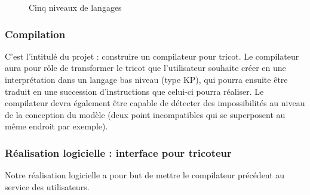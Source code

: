 \documentclass{article}
\begin{document}
    \begin{figure}[!h]
    \centering


    \caption{Cinq niveaux de langages}
    \label{nvx-lg}
    \end{figure}


\subsubsection{Compilation}

C'est l'intitulé du projet : construire un compilateur pour tricot. Le compilateur aura pour rôle de transformer le tricot que
l'utilisateur souhaite créer en une interprétation dans un langage bas niveau (type KP), qui pourra ensuite être traduit en une succession
d'instructions que celui-ci pourra réaliser.
Le compilateur devra également être capable de détecter des impossibilités au niveau de la conception du modèle (deux point incompatibles qui se superposent au même endroit par exemple).


\subsubsection{Réalisation logicielle : interface pour tricoteur}

Notre réalisation logicielle a pour but de mettre le compilateur précédent au service des utilisateurs.
\end{document}

